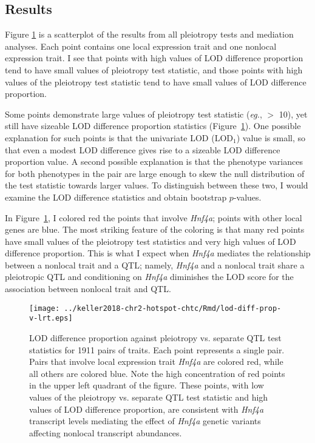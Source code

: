 \documentclass[oneside]{book}\usepackage[]{graphicx}\usepackage[]{color}
\begin{document}
\begin{titlepage}
\subsection{Results}

Figure \ref{fig:lod-diff-prop-v-lrt-all} is a scatterplot of the results from all pleiotropy tests and mediation analyses.
Each point contains one local expression trait and one nonlocal expression trait.
I see that points with high values of LOD difference proportion tend to have small
values of pleiotropy test statistic, and those points with high values of the
pleiotropy test statistic tend to have small values of LOD difference proportion.

Some points demonstrate large values of pleiotropy test statistic (\emph{eg.}, $>$ 10),
yet still have sizeable LOD difference proportion statistics (Figure~\ref{fig:lod-diff-prop-v-lrt-all}).
One possible explanation for such points is that the univariate LOD (LOD$_1$) value is small,
so that even a modest LOD difference gives rise to a sizeable LOD difference proportion value.
A second possible explanation is that the phenotype variances for both phenotypes in the pair
are large enough to skew the null distribution of the test statistic towards larger values.
To distinguish between these two, I would
examine the LOD difference statistics and obtain bootstrap $p$-values.

In Figure~\ref{fig:lod-diff-prop-v-lrt-all}, I colored red the points that involve \emph{Hnf4a};
points with other local genes are blue.
The most striking feature of the coloring is that many red points have small
values of the pleiotropy test statistics and very high values of LOD difference
proportion. This is what I expect when \emph{Hnf4a} mediates the relationship
between a nonlocal trait and a QTL; namely, \emph{Hnf4a} and a nonlocal trait
share a pleiotropic QTL and conditioning on \emph{Hnf4a} diminishes the LOD
score for the association between nonlocal trait and QTL.



\begin{figure}
    \centering
    \texttt{[image: ../keller2018-chr2-hotspot-chtc/Rmd/lod-diff-prop-v-lrt.eps]}
    \caption[LOD difference proportion vs. pleiotropy test statistic]{LOD difference proportion against pleiotropy vs. separate QTL test statistics for 1911 pairs of traits.
    Each point represents a single pair. Pairs that involve local expression trait \emph{Hnf4a} are colored red, while all others are colored blue.
    Note the high concentration of red points in the upper left quadrant of the figure.
    These points, with low values of the pleiotropy vs. separate QTL test statistic and
    high values of LOD difference proportion, are consistent with \emph{Hnf4a} transcript
    levels mediating the effect of \emph{Hnf4a} genetic variants affecting nonlocal
    transcript abundances.}
    \label{fig:lod-diff-prop-v-lrt-all}
\end{figure}


\end{titlepage}
\end{document}
